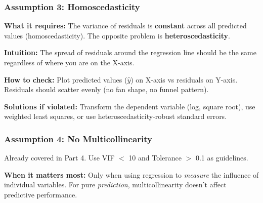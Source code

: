 \documentclass[12pt,openany]{book}
\begin{document}
\medskip


\subsubsection{Assumption 3: Homoscedasticity}


\textbf{What it requires:} The variance of residuals is \textbf{constant} across all predicted values (homoscedasticity). The opposite problem is \textbf{heteroscedasticity}.

\textbf{Intuition:} The spread of residuals around the regression line should be the same regardless of where you are on the X-axis.


\begin{center}
\end{center}



\textbf{How to check:} Plot predicted values (\(\hat{y}\)) on X-axis vs residuals on Y-axis. Residuals should scatter evenly (no fan shape, no funnel pattern).

\textbf{Solutions if violated:} Transform the dependent variable (log, square root), use weighted least squares, or use heteroscedasticity-robust standard errors.

\medskip


\subsubsection{Assumption 4: No Multicollinearity}


Already covered in Part 4. Use VIF \(<\) 10 and Tolerance \(>\) 0.1 as guidelines.

\textbf{When it matters most:} Only when using regression to \textit{measure} the influence of individual variables. For pure \textit{prediction}, multicollinearity doesn't affect predictive performance.
\end{document}

